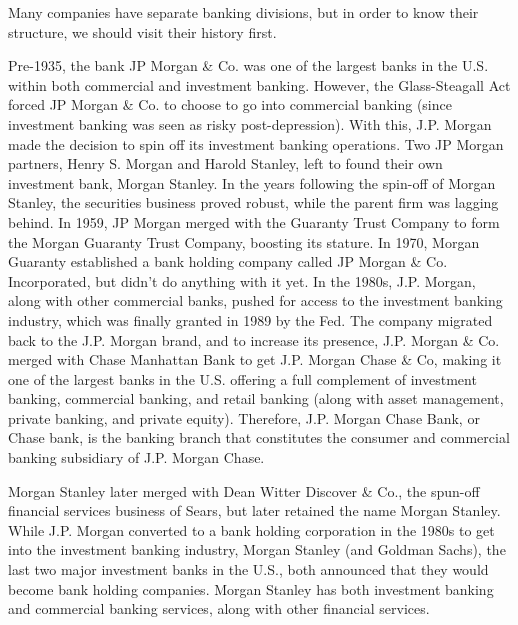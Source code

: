 \documentclass{article}
\begin{document}
      Many companies have separate banking divisions, but in order to know their structure, we should visit their history first. 

      \begin{example}
        \label{ex:j-p-morgan-and-morgan-stanley}
        Pre-1935, the bank JP Morgan \& Co. was one of the largest banks in the U.S. within both commercial and investment banking. However, the Glass-Steagall Act forced JP Morgan \& Co. to choose to go into commercial banking (since investment banking was seen as risky post-depression). With this, J.P. Morgan made the decision to spin off its investment banking operations. Two JP Morgan partners, Henry S. Morgan and Harold Stanley, left to found their own investment bank, Morgan Stanley. In the years following the spin-off of Morgan Stanley, the securities business proved robust, while the parent firm was lagging behind. In 1959, JP Morgan merged with the Guaranty Trust Company to form the Morgan Guaranty Trust Company, boosting its stature. In 1970, Morgan Guaranty established a bank holding company called JP Morgan \& Co. Incorporated, but didn't do anything with it yet. In the 1980s, J.P. Morgan, along with other commercial banks, pushed for access to the investment banking industry, which was finally granted in 1989 by the Fed. The company migrated back to the J.P. Morgan brand, and to increase its presence, J.P. Morgan \& Co. merged with Chase Manhattan Bank to get J.P. Morgan Chase \& Co, making it one of the largest banks in the U.S. offering a full complement of investment banking, commercial banking, and retail banking (along with asset management, private banking, and private equity). Therefore, J.P. Morgan Chase Bank, or Chase bank, is the banking branch that constitutes the consumer and commercial banking subsidiary of J.P. Morgan Chase. 

        Morgan Stanley later merged with Dean Witter Discover \& Co., the spun-off financial services business of Sears, but later retained the name Morgan Stanley. While J.P. Morgan converted to a bank holding corporation in the 1980s to get into the investment banking industry, Morgan Stanley (and Goldman Sachs), the last two major investment banks in the U.S., both announced that they would become bank holding companies. Morgan Stanley has both investment banking and commercial banking services, along with other financial services. 
      \end{example}
\end{document}

